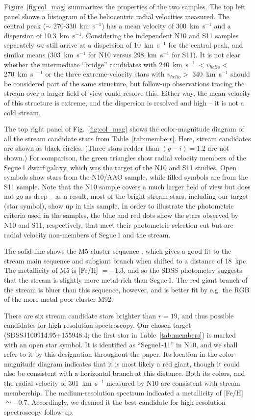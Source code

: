\documentclass[manuscript]{aastex}
\begin{document}
Figure~\ref{fig:col_mag} summarizes the properties of the two samples. The top left panel shows a histogram of the heliocentric radial velocities measured. The central peak ($\sim$ 270-330~km~s$^{-1}$) has a mean velocity of 300~km~s$^{-1}$ and a dispersion of 10.3~km~s$^{-1}$. Considering the independent N10 and S11 samples separately we still arrive at a dispersion of 10~km~s$^{-1}$ for the central peak, and similar means (303~km~s$^{-1}$ for N10 versus 298~km~s$^{-1}$ for S11). It is not clear whether the intermediate ``bridge'' candidates with 240~km~s$^{-1}$ $< v_{helio} < $270~km~s~$^{-1}$ or the three extreme-velocity stars with $v_{helio} > $ 340~km~s$^{-1}$ should be considered part of the same structure, but follow-up observations tracing the stream over a larger field of view could resolve this. Either way, the mean velocity of this structure is extreme, and the dispersion is resolved and high -- it is not a cold stream.

The top right panel of Fig.~\ref{fig:col_mag} shows the color-magnitude diagram of all the stream candidate stars from Table~\ref{tab:members}. Here, stream candidates are shown as black circles. (Three stars redder than $(g-i) = 1.2 $ are not shown.) For comparison, the green triangles show radial velocity members of the Segue\,1 dwarf galaxy, which was the target of the N10 and S11 studies. Open symbols show stars from the N10/AAO sample, while filled symbols are from the S11 sample. Note that the N10 sample covers a much larger field of view but does not go as deep -- as a result, most of the bright stream stars, including our target (star symbol), show up in this sample. In order to illustrate the photometric criteria used in the samples, the blue and red dots show the stars observed by N10 and S11, respectively, that meet their photometric selection cut but are radial velocity non-members of Segue\,1 and the stream.

The solid line shows the M5 cluster sequence \citep{An2008}, which gives a good fit to the stream main sequence and subgiant branch when shifted to a distance of 18~kpc. The metallicity of M5 is [Fe/H] $= -1.3$, and so the SDSS photometry suggests that the stream is slightly more metal-rich than Segue\,1. The red giant branch of the stream is bluer than this sequence, however, and is better fit by e.g. the RGB of the more metal-poor cluster M92.

There are six stream candidate stars brighter than $r = 19$, and thus possible candidates for high-resolution spectroscopy. Our chosen target (SDSSJ100914.95+155948.4; the first star in Table~\ref{tab:members}) is marked with an open star symbol. It is identified as ``Segue1-11'' in N10, and we shall refer to it by this designation throughout the paper. Its location in the color-magnitude diagram indicates that it is most likely a red giant, though it could also be consistent with a horizontal branch at this distance. Both its colors, and the radial velocity of 301~km~s$^{-1}$ measured by N10 are consistent with stream membership. The medium-resolution spectrum indicated a metallicity of [Fe/H]$\simeq -0.7$. Accordingly, we deemed it the best candidate for high-resolution spectroscopy follow-up. 
\end{document}
